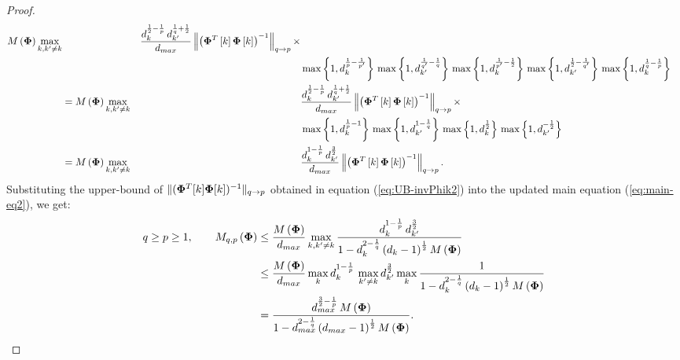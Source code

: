 \begin{proof}
\begin{gather}
\begin{aligned}
M\left( \boldsymbol{\Phi} \right) \displaystyle\max_{k,k' \neq k} &&\frac{d_{k}^{\frac12 - \frac1p} \, d_{k'}^{\frac1q + \frac12}}{d_{max}} \left\lVert\left( \boldsymbol{\Phi}^T \left[ k \right] \boldsymbol{\Phi} \left[ k \right] \right)^{-1}\right\rVert_{q \to p} \times \\
&  &&\max \left\lbrace 1 , d_k^{\frac1p - \frac{1}{p'}} \right\rbrace \, \max \left\lbrace 1 , d_{k'}^{\frac{1}{q'} - \frac1q} \right\rbrace \, \max \left\lbrace 1 , d_k^{\frac{1}{p'} -\frac12} \right\rbrace \, \max \left\lbrace 1 , d_{k'}^{\frac{1}{2} - \frac{1}{q'}} \right\rbrace \, \max \left\lbrace 1 , d_k^{\frac1q - \frac1p} \right\rbrace \\
&=
M\left( \boldsymbol{\Phi} \right) \displaystyle\max_{k,k' \neq k} &&\frac{d_{k}^{\frac12 - \frac1p} \, d_{k'}^{\frac1q + \frac12}}{d_{max}} \left\lVert\left( \boldsymbol{\Phi}^T \left[ k \right] \boldsymbol{\Phi} \left[ k \right] \right)^{-1}\right\rVert_{q \to p} \times \\
& &&\max \left\lbrace 1 , d_k^{\frac1p - 1} \right\rbrace \, \max \left\lbrace 1 , d_{k'}^{1 - \frac1q} \right\rbrace \, \max \left\lbrace 1 , d_k^{\frac12} \right\rbrace \, \max \left\lbrace 1 , d_{k'}^{-\frac12} \right\rbrace \\
&=
M\left( \boldsymbol{\Phi} \right) \displaystyle\max_{k,k' \neq k} &&\frac{d_{k}^{1 - \frac1p} \, d_{k'}^{\frac32}}{d_{max}} \left\lVert\left( \boldsymbol{\Phi}^T \left[ k \right] \boldsymbol{\Phi} \left[ k \right] \right)^{-1}\right\rVert_{q \to p}.
\end{aligned}
\end{gather}
Substituting the upper-bound of $\Vert (\boldsymbol{\Phi}^T[k] \boldsymbol{\Phi}[k])^{-1} \Vert_{q \to p}$ obtained in equation (\ref{eq:UB-invPhik2}) into the updated main equation (\ref{eq:main-eq2}), we get:
\begin{gather*} 
\begin{aligned}
q \geq p \geq 1, \qquad
M_{q,p}\left( \boldsymbol{\Phi} \right) &\leq 
\frac{M\left( \boldsymbol{\Phi} \right)}{d_{max}} \displaystyle\max_{k,k' \neq k} \frac{d_{k}^{1 - \frac1p} \, d_{k'}^{\frac32}}{1 - d_k^{2 - \frac1q} \left( d_k - 1 \right)^\frac12 M \left( \boldsymbol{\Phi} \right)} \\
&\leq \frac{M\left( \boldsymbol{\Phi} \right)}{d_{max}} \displaystyle\max_{k} d_{k}^{1 - \frac1p} \, \displaystyle\max_{k' \neq k} d_{k'}^{\frac32} \displaystyle\max_{k} \frac{1}{1 - d_k^{2 - \frac1q} \left( d_k - 1 \right)^\frac12 M \left( \boldsymbol{\Phi} \right)} \\
&= \frac{d_{max}^{\frac32 - \frac1p} \, M\left( \boldsymbol{\Phi} \right)}{1- d_{max}^{2 - \frac1q} \left( d_{max} - 1 \right)^\frac12 M \left( \boldsymbol{\Phi} \right)}.
\end{aligned}
\end{gather*}
\end{proof}
